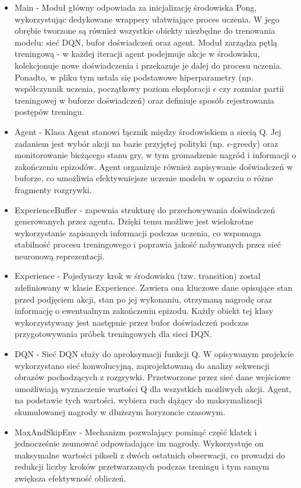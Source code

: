 \documentclass[a4paper, 12pt]{article}
\numberwithin{equation}{section}
\begin{document}
    \begin{itemize}
        \item Main - Moduł główny odpowiada za inicjalizację środowiska Pong, wykorzystując dedykowane wrappery ułatwiające proces uczenia. W jego obrębie tworzone są również wszystkie obiekty niezbędne do trenowania modelu: sieć DQN, bufor doświadczeń oraz agent. Moduł zarządza pętlą treningową - w każdej iteracji agent podejmuje akcje w środowisku, kolekcjonuje nowe doświadczenia i przekazuje je dalej do procesu uczenia. Ponadto, w pliku tym ustala się podstawowe hiperparametry (np. współczynnik uczenia, początkowy poziom eksploracji \( \epsilon \) czy rozmiar partii treningowej w buforze doświadczeń) oraz definiuje sposób rejestrowania postępów treningu.
        \item Agent - Klasa Agent stanowi łącznik między środowiskiem a siecią Q. Jej zadaniem jest wybór akcji na bazie przyjętej polityki (np. \( \epsilon \)-greedy) oraz monitorowanie bieżącego stanu gry, w tym gromadzenie nagród i informacji o zakończeniu epizodów. Agent organizuje również zapisywanie doświadczeń w buforze, co umożliwia efektywniejsze uczenie modelu w oparciu o różne fragmenty rozgrywki.
        \item ExperienceBuffer - zapewnia strukturę do przechowywania doświadczeń generowanych przez agenta. Dzięki temu możliwe jest wielokrotne wykorzystanie zapisanych informacji podczas uczenia, co wspomaga stabilność procesu treningowego i poprawia jakość nabywanych przez sieć neuronową reprezentacji.
        \item Experience - Pojedynczy krok w środowisku (tzw. transition) został zdefiniowany w klasie Experience. Zawiera ona kluczowe dane opisujące stan przed podjęciem akcji, stan po jej wykonaniu, otrzymaną nagrodę oraz informację o ewentualnym zakończeniu epizodu. Każdy obiekt tej klasy wykorzystywany jest następnie przez bufor doświadczeń podczas przygotowywania próbek treningowych dla sieci DQN.
        \item DQN - Sieć DQN służy do aproksymacji funkcji Q. W opisywanym projekcie wykorzystano sieć konwolucyjną, zaprojektowaną do analizy sekwencji obrazów pochodzących z rozgrywki. Przetworzone przez sieć dane wejściowe umożliwiają wyznaczenie wartości Q dla wszystkich możliwych akcji. Agent, na podstawie tych wartości, wybiera ruch dążący do maksymalizacji skumulowanej nagrody w dłuższym horyzoncie czasowym.
        \item MaxAndSkipEnv - Mechanizm pozwalający pominąć część klatek i jednocześnie zsumować odpowiadające im nagrody. Wykorzystuje on maksymalne wartości pikseli z dwóch ostatnich obserwacji, co prowadzi do redukcji liczby kroków przetwarzanych podczas treningu i tym samym zwiększa efektywność obliczeń.

\end{itemize}
\end{document}
